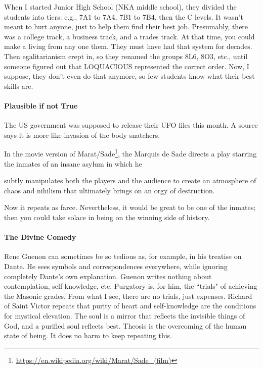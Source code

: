 When I started Junior High School (NKA middle school), they divided the students into tiers: e.g., 7A1 to 7A4, 7B1 to 7B4, then the C levels. It wasn't meant to hurt anyone, just to help them find their best job. Presumably, there was a college track, a business track, and a trades track. At that time, you could make a living from any one them. They must have had that system for decades. Then egalitarianism crept in, so they renamed the groups 8L6, 8O3, etc., until someone figured out that LOQUACIOUS represented the correct order. Now, I suppose, they don't even do that anymore, so few students know what their best skills are.

\paragraph{Plausible if not True}
The US government was supposed to release their UFO files this month. A source says it is more like invasion of the body snatchers.

In the movie version of Marat/Sade\footnote{\url{https://en.wikipedia.org/wiki/Marat/Sade_(film)}}, the Marquis de Sade directs a play starring the inmates of an insane asylum in which he

\begin{quotex}
subtly manipulates both the players and the audience to create an atmosphere of chaos and nihilism that ultimately brings on an orgy of destruction.

\end{quotex}
Now it repeats as farce. Nevertheless, it would be great to be one of the inmates; then you could take solace in being on the winning side of history.

\paragraph{The Divine Comedy}
Rene Guenon can sometimes be so tedious as, for example, in his treatise on Dante. He sees symbols and correspondences everywhere, while ignoring completely Dante's own explanation. Guenon writes nothing about contemplation, self-knowledge, etc. Purgatory is, for him, the ``trials" of achieving the Masonic grades. From what I see, there are no trials, just expenses. Richard of Saint Victor repeats that purity of heart and self-knowledge are the conditions for mystical elevation. The soul is a mirror that reflects the invisible things of God, and a purified soul reflects best. Theosis is the overcoming of the human state of being. It does no harm to keep repeating this.

